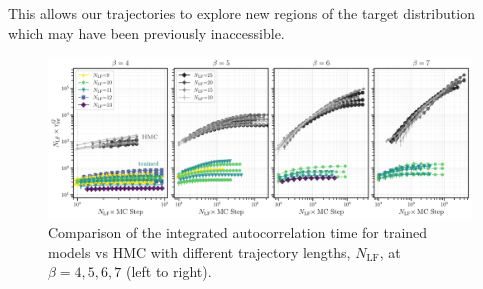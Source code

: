 \documentclass[a4paper,11pt]{article}
\begin{document}
%
This allows our trajectories to explore new regions of the target distribution
which may have been previously inaccessible.
%
\begin{figure}[htpb]
    \includegraphics[width=\textwidth]{assets/tint.pdf}
    \caption{\label{fig:tint}Comparison of the integrated autocorrelation time
        for trained models vs HMC with different trajectory lengths,
    \(N_{\mathrm{LF}}\), at \(\beta = 4, 5, 6, 7\) (left to right).}
\end{figure}
%
\end{document}
